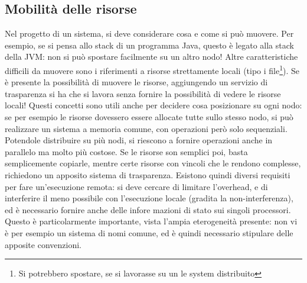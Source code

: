 \subsection{Mobilità delle risorse}
Nel progetto di un sistema, si deve considerare cosa e come si può muovere. Per esempio, se si pensa allo stack di un 
programma Java, questo è legato alla stack della JVM: non si può spostare facilmente su un altro nodo! Altre 
caratteristiche difficili da muovere sono i riferimenti a risorse strettamente locali (tipo i file\footnote{Si
potrebbero spostare, se si lavorasse su un le system distribuito}).
Se è presente la possibilità di muovere le risorse, aggiungendo un servizio di trasparenza si ha che si lavora senza 
fornire la possibilità di vedere le risorse locali!
Questi concetti sono utili anche per decidere cosa posizionare su ogni nodo: se per esempio le risorse dovessero essere 
allocate tutte sullo stesso nodo, si può realizzare un sistema a memoria comune, con operazioni però solo sequenziali.
Potendole distribuire su più nodi, si riescono a fornire operazioni anche in parallelo ma molto più costose. Se le 
risorse son semplici poi, basta semplicemente copiarle, mentre certe risorse con vincoli che le rendono complesse, 
richiedono un apposito sistema di trasparenza.
Esistono quindi diversi requisiti per fare un'esecuzione remota: si deve cercare di limitare l'overhead, e di
interferire il meno possibile con l'esecuzione locale (gradita la non-interferenza), ed è necessario fornire anche delle 
infore mazioni di stato sui singoli processori. Questo è particolarmente importante, vista l'ampia eterogeneità 
presente: non vi è per esempio un sistema di nomi comune, ed è quindi necessario stipulare delle apposite convenzioni.
